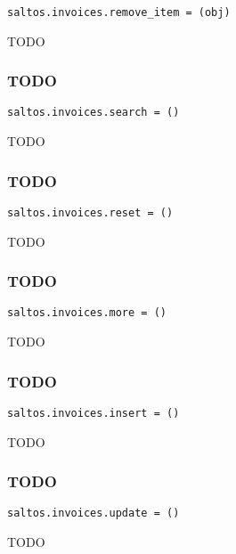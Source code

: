 \documentclass[a4paper]{article}
\begin{document}
\begin{lstlisting}
saltos.invoices.remove_item = (obj)
\end{lstlisting}

TODO

\hypertarget{toc82}{}
\subsubsection{TODO}

\begin{lstlisting}
saltos.invoices.search = ()
\end{lstlisting}

TODO

\hypertarget{toc83}{}
\subsubsection{TODO}

\begin{lstlisting}
saltos.invoices.reset = ()
\end{lstlisting}

TODO

\hypertarget{toc84}{}
\subsubsection{TODO}

\begin{lstlisting}
saltos.invoices.more = ()
\end{lstlisting}

TODO

\hypertarget{toc85}{}
\subsubsection{TODO}

\begin{lstlisting}
saltos.invoices.insert = ()
\end{lstlisting}

TODO

\hypertarget{toc86}{}
\subsubsection{TODO}

\begin{lstlisting}
saltos.invoices.update = ()
\end{lstlisting}

TODO
\end{document}
